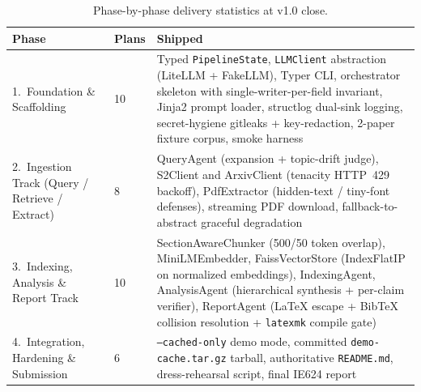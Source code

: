 \documentclass[12pt,a4paper]{article}
\begin{document}
\begin{table}[htbp]
\centering
\caption{Phase-by-phase delivery statistics at v1.0 close.}
\label{tab:phase-stats}
\small
\begin{tabular}{@{}llp{7.5cm}@{}}
\toprule
\textbf{Phase} & \textbf{Plans} & \textbf{Shipped} \\
\midrule
1.~Foundation \& Scaffolding & 10 & Typed \texttt{PipelineState}, \texttt{LLMClient} abstraction (LiteLLM + FakeLLM), Typer CLI, orchestrator skeleton with single-writer-per-field invariant, Jinja2 prompt loader, structlog dual-sink logging, secret-hygiene gitleaks + key-redaction, 2-paper fixture corpus, smoke harness \\
2.~Ingestion Track (Query / Retrieve / Extract) & 8 & QueryAgent (expansion + topic-drift judge), S2Client and ArxivClient (tenacity HTTP~429 backoff), PdfExtractor (hidden-text / tiny-font defenses), streaming PDF download, fallback-to-abstract graceful degradation \\
3.~Indexing, Analysis \& Report Track & 10 & SectionAwareChunker (500/50 token overlap), MiniLMEmbedder, FaissVectorStore (IndexFlatIP on normalized embeddings), IndexingAgent, AnalysisAgent (hierarchical synthesis + per-claim verifier), ReportAgent (LaTeX escape + BibTeX collision resolution + \texttt{latexmk} compile gate) \\
4.~Integration, Hardening \& Submission & 6 & \texttt{--cached-only} demo mode, committed \texttt{demo-cache.tar.gz} tarball, authoritative \texttt{README.md}, dress-rehearsal script, final IE624 report \\
\bottomrule
\end{tabular}
\end{table}
\end{document}
